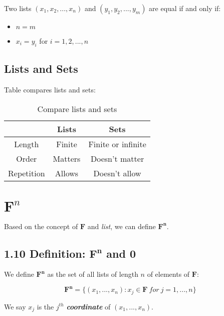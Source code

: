 \documentclass[12pt, letterpaper, oneside]{book}
\begin{document}
Two lists $(x_1, x_2, ..., x_n)$ and $(y_1, y_2, ..., y_m)$ are equal if and
only if:
\begin{itemize}
  \item $n = m$
  \item $x_i = y_i$ for $i = 1, 2, ..., n$
\end{itemize}

\subsection{Lists and Sets}

Table compares lists and sets:
\begin{table}[H]
\centering
\begin{tabular}{||c c c ||}
 \hline
   & Lists & Sets \\ [0.5ex]
 \hline
 \hline
 Length & Finite & Finite or infinite \\
 Order & Matters & Doesn't matter \\
 Repetition & Allows & Doesn't allow \\ [1ex]
 \hline
\end{tabular}
\caption{Compare lists and sets}
\label{table:lists_sets_comp}
\end{table}

\section{$\mathbf{F}^n$}

Based on the concept of $\mathbf{F}$ and \textit{list}, we can define
$\mathbf{F^n}$.

\subsection{1.10 Definition: $\mathbf{F^n}$ and $\mathbf{0}$}

We define $\mathbf{F^n}$ as the set of all lists of length $n$ of elements of
$\mathbf{F}$:

\[
  \mathbf{F^n} = \{(x_1, ..., x_n): x_j \in \mathbf{F} \ for \ j = 1, ..., n\}
\]

We say $x_j$ is the $j^{th}$ \textbf{\textit{coordinate}} of $(x_1, ..., x_n)$.
\end{document}
